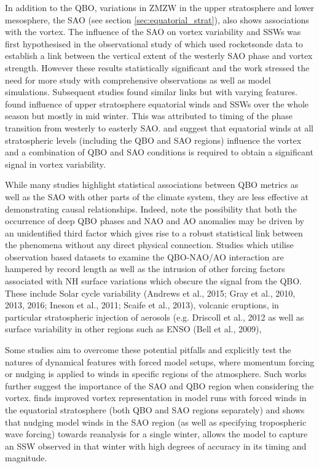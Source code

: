 In addition to the QBO, variations in ZMZW in the upper stratosphere and lower mesosphere, the SAO (see section \ref{sec:equatorial_strat}), also shows associations with the vortex. The influence of the SAO on vortex variability and SSWs was first hypothesised in the observational study of \cite{grayData2001} which used rocketsonde data to establish a link between the vertical extent of the westerly SAO phase and vortex strength. However these results statistically significant and the work stressed the need for more study with comprehensive observations as well as model simulations. Subsequent studies found similar links but with varying features. \cite{grayinfluence2003} found influence of upper stratosphere equatorial winds and SSWs over the whole season but mostly in mid winter. This was attributed to timing of the phase transition from westerly to easterly SAO. \cite{JGray2001} and \cite{hamiltonEffects1998} suggest that equatorial winds at all stratospheric levels (including the QBO and SAO regions) influence the vortex and a combination of QBO and SAO conditions is required to obtain a significant signal in vortex variability.

While many studies highlight statistical associations between QBO metrics as well as the SAO with other parts of the climate system, they are less effective at demonstrating causal relationships. Indeed, \cite{andrewsObserved2019} note the possibility that both the occurrence of deep QBO phases and NAO and AO anomalies may be driven by an unidentified third factor which gives rise to a robust statistical link between the phenomena without any direct physical connection. Studies which utilise observation based datasets to examine the QBO-NAO/AO interaction are hampered by record length as well as the intrusion of other forcing factors associated with NH surface variations which obscure the signal from the QBO. These include Solar cycle variability (Andrews et al., 2015; Gray et al., 2010, 2013, 2016; Ineson et al., 2011; Scaife et al., 2013), volcanic eruptions, in particular stratospheric injection of aerosols (e.g. Driscoll et al., 2012 as well as surface variability in other regions such as ENSO (Bell et al., 2009), 

Some studies aim to overcome these potential pitfalls and explicitly test the natures of dynamical features with forced model setups, where momentum forcing or nudging is applied to winds in specific regions of the atmosphere. Such works further suggest the importance of the SAO and QBO region when considering the vortex. \cite{Pascoe2005} finds improved vortex representation in model runs with forced winds in the equatorial stratosphere (both QBO and SAO regions separately) and \cite{Brown2019} shows that nudging model winds in the SAO region (as well as specifying tropospheric wave forcing) towards reanalysis for a single winter, allows the model to capture an SSW observed in that winter with high degrees of accuracy in its timing and magnitude.   

